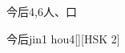 \begin{entry}{今后}{4,6}{⼈、⼝}
  \begin{phonetics}{今后}{jin1 hou4}[][HSK 2]
  \end{phonetics}
\end{entry}
